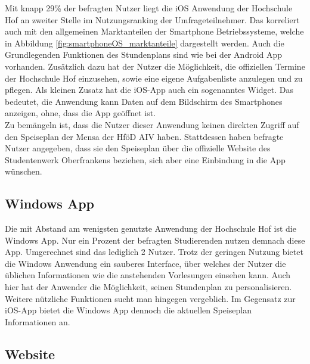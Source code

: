 Mit knapp 29\% der befragten Nutzer liegt die \ac{iOS} Anwendung der Hochschule Hof an zweiter Stelle im Nutzungsranking der Umfrageteilnehmer. Das korreliert auch mit den allgemeinen Marktanteilen der Smartphone Betriebssysteme, welche in Abbildung \ref{fig:smartphoneOS_marktanteile} dargestellt werden\autocite[Vgl.][]{mobileosstatista}. Auch die Grundlegenden Funktionen des Stundenplans sind wie bei der Android \ac{App} vorhanden. Zusätzlich dazu hat der Nutzer die Möglichkeit, die offiziellen Termine der Hochschule Hof einzusehen, sowie eine eigene Aufgabenliste anzulegen und zu pflegen. Als kleinen Zusatz hat die \ac{iOS}-\ac{App} auch ein sogenanntes Widget. Das bedeutet, die Anwendung kann Daten auf dem Bildschirm des Smartphones anzeigen, ohne, dass die \ac{App} geöffnet ist.
\\
\linebreak
Zu bemängeln ist, dass die Nutzer dieser Anwendung keinen direkten Zugriff auf den Speiseplan der Mensa der \ac{HföD AIV} haben. Stattdessen haben befragte Nutzer angegeben, dass sie den Speiseplan über die offizielle Website des Studentenwerk Oberfrankens beziehen, sich aber eine Einbindung in die \ac{App} wünschen\autocite[][]{umfrage}.

\subsection{Windows App}

Die mit Abstand am wenigsten genutzte Anwendung der Hochschule Hof ist die Windows \ac{App}. Nur ein Prozent der befragten Studierenden nutzen demnach diese \ac{App}. Umgerechnet sind das lediglich 2 Nutzer. Trotz der geringen Nutzung bietet die Windows Anwendung ein sauberes Interface, über welches der Nutzer die üblichen Informationen wie die anstehenden Vorlesungen einsehen kann. Auch hier hat der Anwender die Möglichkeit, seinen Stundenplan zu personalisieren. Weitere nützliche Funktionen sucht man hingegen vergeblich. Im Gegensatz zur \ac{iOS}-\ac{App} bietet die Windows \ac{App} dennoch die aktuellen Speiseplan Informationen an.

\subsection{Website}

